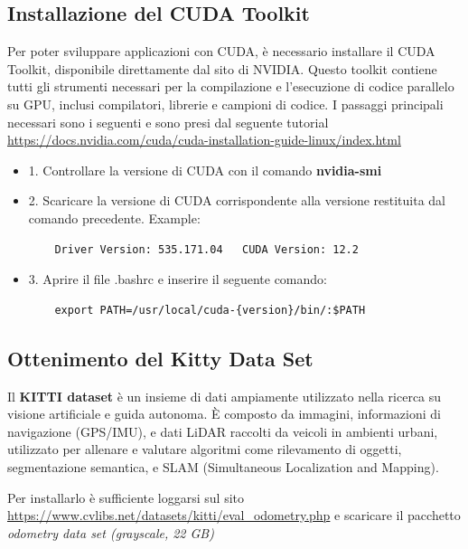 \documentclass[12pt,a4paper]{report}
\begin{document}
\subsection{Installazione del CUDA Toolkit}

Per poter sviluppare applicazioni con CUDA, è necessario installare il CUDA Toolkit, disponibile direttamente dal sito di NVIDIA. Questo toolkit contiene tutti gli strumenti necessari per la compilazione e l'esecuzione di codice parallelo su GPU, inclusi compilatori, librerie e campioni di codice. I passaggi principali necessari sono i seguenti e sono presi dal seguente tutorial \url{https://docs.nvidia.com/cuda/cuda-installation-guide-linux/index.html}

\begin{itemize}
    \item 1. Controllare la versione di CUDA con il comando \textbf{nvidia-smi}
    \item 2. Scaricare la versione di CUDA corrispondente alla versione restituita dal comando precedente. Example: 
    \begin{verbatim}
    Driver Version: 535.171.04   CUDA Version: 12.2
    \end{verbatim}
    
    \item 3. Aprire il file .bashrc e inserire il seguente comando:
    \begin{verbatim}
    export PATH=/usr/local/cuda-{version}/bin/:$PATH
    \end{verbatim}
\end{itemize}

\subsection{Ottenimento del Kitty Data Set}

Il \textbf{KITTI dataset} è un insieme di dati ampiamente utilizzato nella ricerca su visione artificiale e guida autonoma. È composto da immagini, informazioni di navigazione (GPS/IMU), e dati LiDAR raccolti da veicoli in ambienti urbani, utilizzato per allenare e valutare algoritmi come rilevamento di oggetti, segmentazione semantica, e SLAM (Simultaneous Localization and Mapping).

Per installarlo è sufficiente loggarsi sul sito \url{https://www.cvlibs.net/datasets/kitti/eval_odometry.php} e scaricare il pacchetto \textit{odometry data set (grayscale, 22 GB)}
\end{document}

